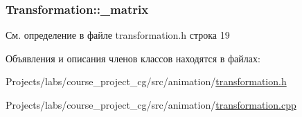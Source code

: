 \subsubsection[{\texorpdfstring{\+\_\+matrix}{_matrix}}]{ Transformation\+::\+\_\+matrix\hspace{0.3cm}{\ttfamily [protected]}}\hypertarget{class_transformation_a88b601bf5613460d361ada4b7a9208e3}{}\label{class_transformation_a88b601bf5613460d361ada4b7a9208e3}


См. определение в файле transformation.\+h строка 19



Объявления и описания членов классов находятся в файлах\+:\begin{DoxyCompactItemize}
\item 
Projects/labs/course\+\_\+project\+\_\+cg/src/animation/\hyperlink{transformation_8h}{transformation.\+h}\item 
Projects/labs/course\+\_\+project\+\_\+cg/src/animation/\hyperlink{transformation_8cpp}{transformation.\+cpp}\end{DoxyCompactItemize}
